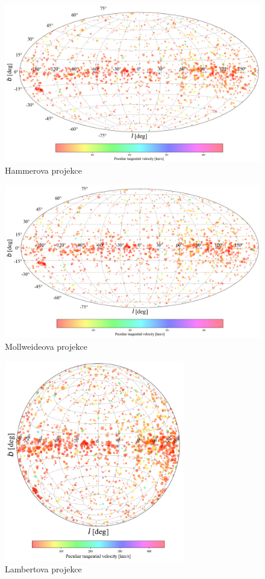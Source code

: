 \documentclass[a4paper,11pt]{article}
\begin{document}
                \begin{figure}
                    \centering
                    \includegraphics[width=1\textwidth]{hammer}
                    \caption{Hammerova projekce}
                    \label{fig:hammer}
                \end{figure}
                \begin{figure}
                    \centering
                    \includegraphics[width=1\textwidth]{mollweide}
                    \caption{Mollweideova projekce}
                    \label{fig:mollweide}
                \end{figure}
                \begin{figure}
                    \centering
                    \includegraphics[width=0.7\textwidth]{lambert}
                    \caption{Lambertova projekce}
                    \label{fig:lambert}
                \end{figure}
\end{document}
